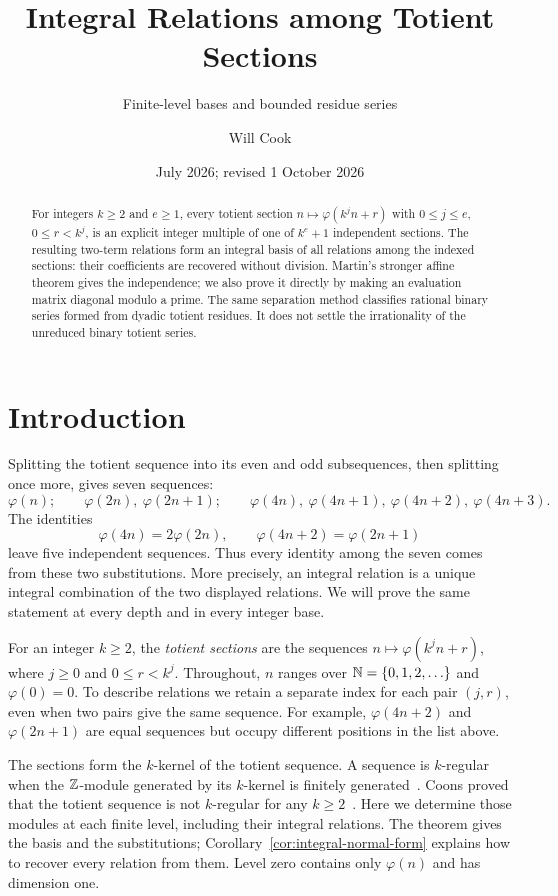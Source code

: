 \documentclass[11pt]{article}
\title{Integral Relations among Totient Sections}
\subtitle{Finite-level bases and bounded residue series}
\author{Will Cook}
\date{July 2026; revised 1 October 2026}
\begin{document}
\maketitle
\noteprovenance

\begin{abstract}
For integers $k\ge2$ and $e\ge1$, every totient section
$n\mapsto\varphi(k^jn+r)$ with $0\le j\le e$, $0\le r<k^j$,
is an explicit integer multiple of one of $k^e+1$ independent sections.
The resulting two-term relations form an integral basis of all relations
among the indexed sections: their coefficients are recovered without
division. Martin's stronger affine theorem gives the independence;
we also prove it directly by making an evaluation matrix diagonal
modulo a prime. The same separation method classifies rational binary
series formed from dyadic totient residues. It does not settle the
irrationality of the unreduced binary totient series.
\end{abstract}

\section{Introduction}\label{sec:results}
Splitting the totient sequence into its even and odd subsequences,
then splitting once more, gives seven sequences:
\[
 \varphi(n);\qquad
 \varphi(2n),\ \varphi(2n+1);\qquad
 \varphi(4n),\ \varphi(4n+1),\ \varphi(4n+2),\ \varphi(4n+3).
\]
The identities
\[
 \varphi(4n)=2\varphi(2n),\qquad
 \varphi(4n+2)=\varphi(2n+1)
\]
leave five independent sequences. Thus every identity among the seven
comes from these two substitutions. More precisely, an integral
relation is a unique integral combination of the two displayed
relations. We will prove the same statement at every depth and in
every integer base.

For an integer $k\ge2$, the \emph{totient sections} are the sequences
$n\mapsto\varphi(k^jn+r)$, where $j\ge0$ and $0\le r<k^j$.
Throughout, $n$ ranges over $\mathbb{N}=\{0,1,2,\ldots\}$ and
$\varphi(0)=0$. To describe relations we retain a separate index for
each pair $(j,r)$, even when two pairs give the same sequence.
For example, $\varphi(4n+2)$ and $\varphi(2n+1)$ are equal sequences
but occupy different positions in the list above.

The sections form the $k$-kernel of the totient sequence. A sequence is
$k$-regular when the $\mathbb{Z}$-module generated by its $k$-kernel is finitely
generated~\cite{allouche-shallit}. Coons proved that the totient sequence is
not $k$-regular for any $k\ge2$~\cite[Thm.~3.2]{coons}.
Here we determine those modules at each finite level, including their
integral relations. The theorem gives the basis and the substitutions;
Corollary~\ref{cor:integral-normal-form} explains how to recover every
relation from them. Level zero contains only $\varphi(n)$ and has
dimension one.
\end{document}
